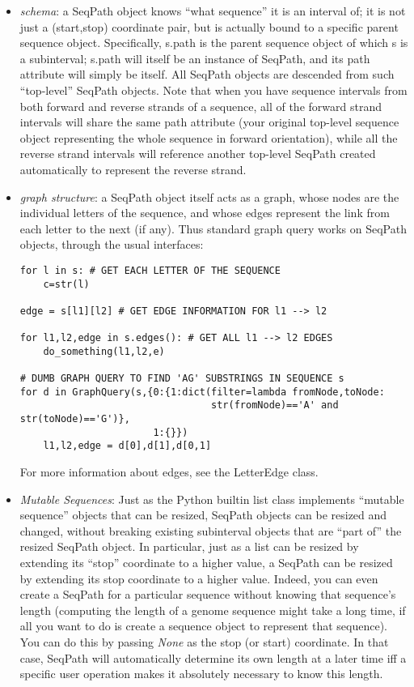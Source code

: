 \documentclass{howto}
\begin{document}
\begin{itemize}
\item
{\em schema}: a SeqPath object knows ``what sequence'' it is an interval of;
it is not just a (start,stop) coordinate pair, but is actually bound to a specific
parent sequence object.  Specifically, s.path is the parent sequence object of
which s is a subinterval; s.path will itself be an instance of SeqPath, and its path
attribute will simply be itself.  All SeqPath objects are descended from such ``top-level''
SeqPath objects.  Note that when you have sequence intervals from both forward
and reverse strands of a sequence, all of the forward strand intervals will share
the same path attribute (your original top-level sequence object representing
the whole sequence in forward orientation), while all the reverse strand intervals
will reference another top-level SeqPath created automatically to represent the
reverse strand.

\item
{\em graph structure}: a SeqPath object itself acts as a graph, whose nodes are
the individual letters of the sequence, and whose edges represent the link 
from each letter to the next (if any).  Thus standard graph query works on
SeqPath objects, through the usual interfaces:

\begin{verbatim}
for l in s: # GET EACH LETTER OF THE SEQUENCE
    c=str(l)

edge = s[l1][l2] # GET EDGE INFORMATION FOR l1 --> l2

for l1,l2,edge in s.edges(): # GET ALL l1 --> l2 EDGES
    do_something(l1,l2,e)

# DUMB GRAPH QUERY TO FIND 'AG' SUBSTRINGS IN SEQUENCE s
for d in GraphQuery(s,{0:{1:dict(filter=lambda fromNode,toNode:
                                 str(fromNode)=='A' and str(toNode)=='G')},
                       1:{}})
    l1,l2,edge = d[0],d[1],d[0,1]
\end{verbatim}  

For more information about edges, see the LetterEdge class.

\item
{\em Mutable Sequences}: Just as the Python builtin list class implements
``mutable sequence'' objects that can be resized, SeqPath objects can be
resized and changed, without breaking existing subinterval objects that
are ``part of'' the resized SeqPath object.  In particular, just as a list
can be resized by extending its ``stop'' coordinate to a higher value, a SeqPath can
be resized by extending its stop coordinate to a higher value.  Indeed,
you can even create a SeqPath for a particular sequence without knowing that
sequence's length (computing the length of a genome sequence might take a long
time, if all you want to do is create a sequence object to represent that
sequence).  You can do this by passing {\em None} as the stop (or start)
coordinate.  In that case, SeqPath will automatically determine its own
length at a later time iff a specific user operation makes it absolutely 
necessary to know this length.


\end{itemize}
\end{document}
